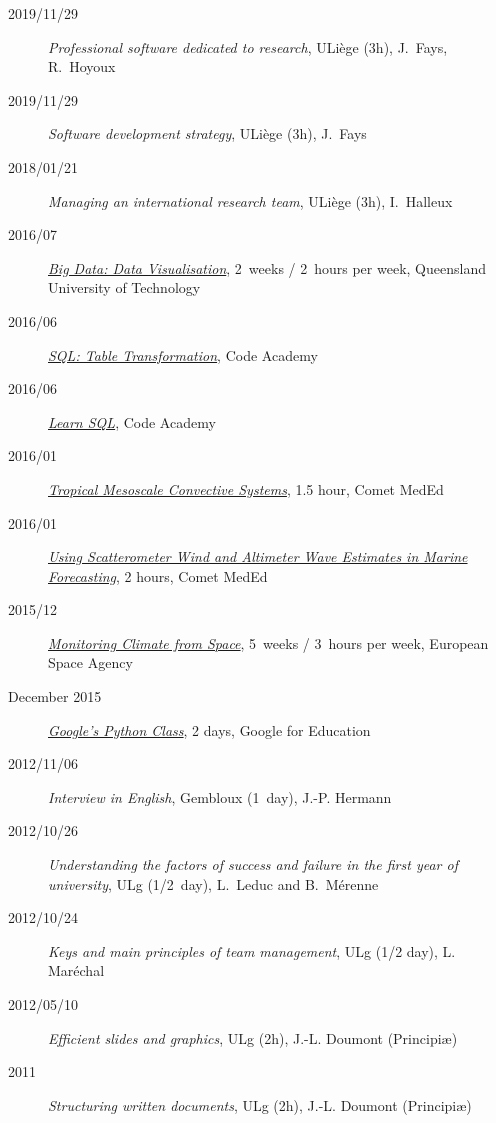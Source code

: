 \documentclass[10pt,a4paper,svgnames]{article}
\begin{document}
\begin{description}
\item[2019/11/29]{\textit{Professional software dedicated to research}, ULiège (3h), J.~Fays, R.~Hoyoux}
\item[2019/11/29]{\textit{Software development strategy}, ULiège (3h), J.~Fays}
\item[2018/01/21]{\textit{Managing an international research team}, ULiège (3h), I.~Halleux}
\item[2016/07]{\href{https://www.futurelearn.com/courses/big-data-visualisation}{\textit{Big Data: Data Visualisation}}, 2~weeks / 2~hours per week, Queensland University of Technology}
\item[2016/06]{\href{https://www.codecademy.com/learn/sql-table-transformation}{\textit{SQL: Table Transformation}}, Code Academy}
\item[2016/06]{\href{https://www.codecademy.com/learn/learn-sql}{\textit{Learn SQL}}, Code Academy}
\item[2016/01]{\href{https://www.meted.ucar.edu/training_module.php?id=993}{\textit{Tropical Mesoscale Convective Systems}}, 1.5 hour, Comet MedEd}
\item[2016/01]{\href{https://www.meted.ucar.edu/training_module.php?id=1093}{\textit{Using Scatterometer Wind and Altimeter Wave Estimates in Marine Forecasting}}, 2 hours, Comet MedEd}
\item[2015/12]{\href{https://www.futurelearn.com/courses/climate-from-space}{\textit{Monitoring Climate from Space}}, 5~weeks / 3~hours per week, European Space Agency}
\item[December 2015]{\href{https://developers.google.com/edu/python/?hl=en}{\textit{Google's Python Class}}, 2 days, Google for Education}
\item[2012/11/06]{\textit{Interview in English}, Gembloux (1~day), J.-P. Hermann}
\item[2012/10/26]{\textit{Understanding the factors of success and failure in the first year of university}, ULg (1/2~day), L.~Leduc and B.~M\'{e}renne}
\item[2012/10/24]{\textit{Keys and main principles of team management}, ULg  (1/2 day), L. Mar\'{e}chal}
\item[2012/05/10]{\textit{Efficient slides and graphics}, ULg (2h), J.-L. Doumont (Principi\ae)}

\item[2011]{\textit{Structuring written documents}, ULg (2h), J.-L. Doumont (Principi\ae)}
\end{description}
\end{document}
